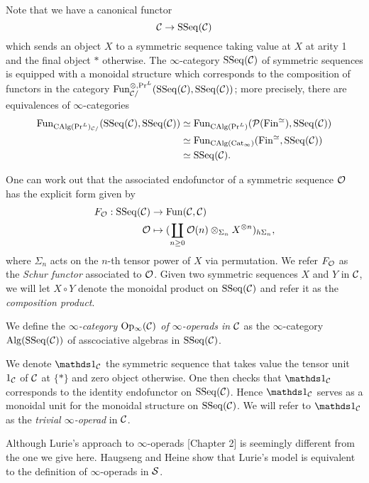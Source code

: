 Note that we have a canonical functor 
\[
{\mathcal{C}} \to \operatorname{SSeq}({\mathcal{C}})
\]
which sends an object $X$ to a symmetric sequence taking value at $X$ at arity 1 and the final object $*$ otherwise. 
The $\infty$-category $\operatorname{SSeq}({\mathcal{C}})$ of symmetric sequences is equipped with a monoidal structure which corresponds to the composition of functors in the category $\operatorname{Fun}_{{\mathcal{C}}/}^{\otimes,\Pr^{L}}(\operatorname{SSeq}({\mathcal{C}}),\operatorname{SSeq}({\mathcal{C}}))$; more precisely, there are equivalences of $\infty$-categories
\begin{align*}
	\operatorname{Fun}_{\operatorname{CAlg}(\Pr^L)_{{\mathcal{C}}/}}(\operatorname{SSeq}({\mathcal{C}}),\operatorname{SSeq}({\mathcal{C}}))
	& \simeq 
\operatorname{Fun}_{\operatorname{CAlg}(\Pr^L)}({\mathcal{P}}(\operatorname{Fin}^{\simeq}),\operatorname{SSeq}({\mathcal{C}}))\\
& \simeq
\operatorname{Fun}_{\operatorname{CAlg}(\operatorname{Cat}_{\infty})}(\operatorname{Fin}^{\simeq},\operatorname{SSeq}({\mathcal{C}}))\\
& \simeq \operatorname{SSeq}({\mathcal{C}}).
\end{align*}

One can work out  that the associated endofunctor of a symmetric sequence ${\mathcal{O}}$ has the explicit form given by
\begin{align*}
		F_{{\mathcal{O}}}: \operatorname{SSeq}({\mathcal{C}}) & \rightarrow \operatorname{Fun}({\mathcal{C}},{\mathcal{C}})\\
	{\mathcal{O}}        & \mapsto     (\coprod_{n\geq 0} {\mathcal{O}}(n)\otimes_{\Sigma_n} X^{\otimes n})_{h\Sigma_n},
\end{align*}
where $\Sigma_n$ acts on the $n$-th tensor power of $X$ via permutation.
We refer $F_{{\mathcal{O}}}$ as the \emph{Schur functor} associated to ${\mathcal{O}}$.
Given two symmetric sequences $X$ and $Y$ in ${\mathcal{C}}$, we will let $X\circ Y$ denote the monoidal product on $\operatorname{SSeq}({\mathcal{C}})$ and refer it as the \emph{composition product}.

\begin{definition}
	\label{inf operads}
	We define the \emph{$\infty$-category $\operatorname{Op_{\infty}}({\mathcal{C}})$ of $\infty$-operads in ${\mathcal{C}}$} as the $\infty$-category $\operatorname{Alg}(\operatorname{SSeq}({\mathcal{C}}))$ of asscociative algebras in $\operatorname{SSeq}({\mathcal{C}})$.
\end{definition}

\begin{remark}
	We denote $\triv_{\CC}$ the symmetric sequence that takes value the tensor unit $1_{\mathcal{C}}$ of ${\mathcal{C}}$ at $\{*\}$ and zero object otherwise. One then checks that $\triv_{\CC}$ corresponds to the identity endofunctor on $\operatorname{SSeq}({\mathcal{C}})$. Hence $\triv_{\CC}$ serves as a monoidal unit for the monoidal structure on $\operatorname{SSeq}({\mathcal{C}})$.
	We will refer to $\triv_{\CC}$ as the \emph{trivial $\infty$-operad} in ${\mathcal{C}}$.
\end{remark}


\begin{remark}
Although Lurie's approach to $\infty$-operads \cite{HA}[Chapter 2] is seemingly different from the one we give here. 
Haugseng  and Heine \cite{Hadrianphdthesis} show that Lurie's model is equivalent to the definition of $\infty$-operads in $\operatorname{\mathcal{S}}$.
\end{remark}

